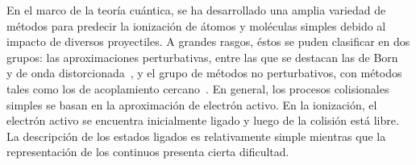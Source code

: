 En el marco de la teoría cuántica, se ha desarrollado una amplia 
variedad de métodos para predecir la ionización de átomos y moléculas 
simples debido al impacto de diversos proyectiles. A grandes rasgos, 
éstos se puden clasificar en dos grupos: las aproximaciones 
perturbativas, entre las que se destacan las de Born~\cite{Bates:62,
McDowell:61} y de onda distorcionada~\cite{Crothers:10,Rivarola:87}, y 
el grupo de métodos no perturbativos, con métodos tales como los de 
acoplamiento cercano~\cite{Pindzola:07,Burke:11,Bray:17}. En general, 
los procesos colisionales simples se basan en la aproximación de 
electrón activo. En la ionización, el electrón activo se encuentra 
inicialmente ligado y luego de la colisión está libre. La descripción de 
los estados ligados es relativamente simple mientras que la 
representación de los continuos presenta cierta dificultad. 

